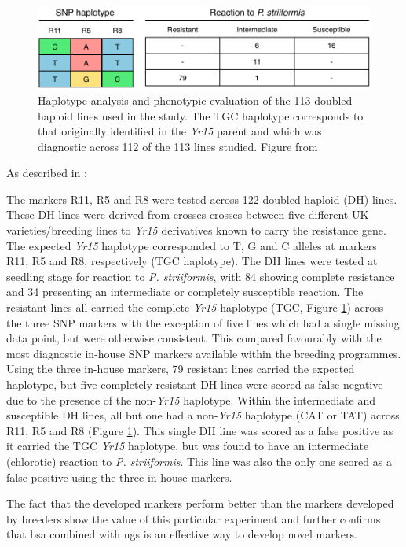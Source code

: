 \begin{figure}
\includegraphics[width=1\textwidth]{Yr15/Figures/breedersTest.pdf}
\caption[Haplotype and phenotype of 113 doubled haploid lines]{Haplotype analysis and phenotypic evaluation of the 113 doubled haploid lines used in the study. The TGC haplotype corresponds to that originally identified in the \textit{Yr15} parent and which was diagnostic across 112 of the 113 lines studied. Figure from \citep{Ramirez-Gonzalez2015b}}
\label{fig:yr15:breeders}
\end{figure}

As described in \citet{Ramirez-Gonzalez2015b}:  
\begin{blockquote} The markers
 R11, R5 and R8 were tested across 122 doubled haploid (DH) lines. 
These DH lines were derived from crosses crosses between five different UK varieties/breeding lines to \textit{Yr15} derivatives known to carry the resistance gene. 
The expected \textit{Yr15} haplotype corresponded to T, G and C alleles at markers R11, R5 and R8, respectively (TGC haplotype). 
The DH lines were tested at seedling stage for reaction to \textit{P. striiformis}, with 84 showing complete resistance and 34 presenting an intermediate or completely susceptible reaction.
The resistant lines all carried the complete \textit{Yr15} haplotype (TGC, Figure \ref{fig:yr15:breeders}) across the three SNP markers with the exception of five lines which had a single missing data point, but were otherwise consistent. 
This compared favourably with the most diagnostic in-house SNP markers available within the breeding programmes. 
Using the three in-house markers, 79 resistant lines carried the expected haplotype, but five completely resistant DH lines were scored as false negative due to the presence of the non-\textit{Yr15} haplotype. 
Within the intermediate and susceptible DH lines, all but one had a non-\textit{Yr15} haplotype (CAT or TAT) across R11, R5 and R8 (Figure \ref{fig:yr15:breeders}). This single DH line was scored as a false positive as it carried the TGC \textit{Yr15} haplotype, but was found to have an intermediate (chlorotic) reaction to \textit{P. striiformis}. This line was also the only one scored as a false positive using the three in-house markers.
\end{blockquote}
The fact that the developed markers perform better than the markers developed by breeders show the value of this particular experiment and further confirms that \acrshort{bsa} combined with \acrshort{ngs} is an effective way to develop novel markers. 

